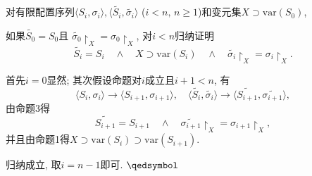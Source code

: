 \documentclass[UTF8]{ctexart}
\begin{document}
\vspace{5pt}

对有限配置序列$\langle S_i,\sigma_i\rangle,
\langle\widetilde{S_i},\widetilde{\sigma_i}\rangle$
($i<n,\,n\geqslant 1$)和变元集$X\supset\mathrm{var}(S_0)$,

如果$\widetilde{S_0}=S_0$且
$\widetilde{\sigma_0}\!\restriction_X=\sigma_0\!\restriction_X$,
对$i<n$归纳证明
\[
    \widetilde{S_i}=S_i\quad\land\quad X\supset\mathrm{var}(S_i)\quad\land\quad
    \widetilde{\sigma_i}\!\restriction_X=\sigma_i\!\restriction_X.
\]

首先$i=0$显然; 其次假设命题对$i$成立且$i+1<n$, 有
\[
    \langle S_i,\sigma_i\rangle\to\langle S_{i+1},\sigma_{i+1}\rangle,\quad
    \langle\widetilde{S_i},\widetilde{\sigma_i}\rangle\to
    \langle\widetilde{S_{i+1}},\widetilde{\sigma_{i+1}}\rangle,
\]
由命题3得
\[
    \widetilde{S_{i+1}}=S_{i+1}\quad\land\quad
    \widetilde{\sigma_{i+1}}\!\restriction_X=\sigma_{i+1}\!\restriction_X,
\]
并且由命题1得$X\supset\mathrm{var}(S_i)\supset\mathrm{var}(S_{i+1})$.

\vspace{3pt}
归纳成立, 取$i=n-1$即可. \hfill $\qedsymbol$
\end{document}
